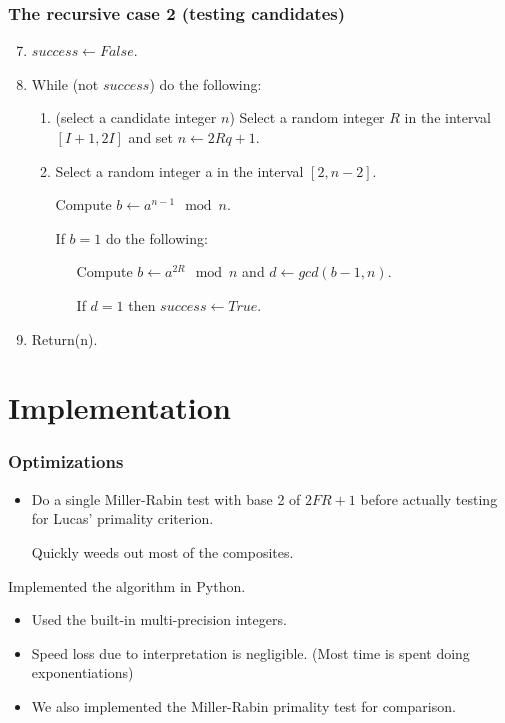 \documentclass{beamer}
\begin{document}
\begin{frame}
\frametitle{The recursive case 2 (testing candidates)}
\begin{enumerate}
  \setcounter{enumi}{6}
\item $success\leftarrow False$. 
\item While (not $success$) do the following:
  \begin{enumerate}
\item (select a candidate integer $n$) Select a random integer $R$ in the interval 
$[I + 1, 2I]$ and set $n\leftarrow 2Rq + 1$. 
\item Select a random integer a in the interval $[2, n - 2]$. 

Compute $b\leftarrow a^{n-1} \mod n$. 

If $b = 1$ do the following: 

\ \ \ Compute $b\leftarrow a^{2R} \mod n$ and $d\leftarrow  gcd(b - 1, n)$.

\ \ \ If $d = 1$ then $success\leftarrow True$.
\end{enumerate} 
\item Return(n). 
\end{enumerate}
\end{frame}

\section{Implementation}
\begin{frame}
\frametitle{Optimizations}
\begin{itemize}
\item Do a single Miller-Rabin test with base 2 of $2FR+1$ before
  actually testing for Lucas' primality criterion.

  Quickly weeds out most of the composites.
\end{itemize}
\end{frame}

\begin{frame}
Implemented the algorithm in Python.
\begin{itemize}
\item Used the built-in multi-precision integers.

\item Speed loss due to interpretation is negligible. (Most time is
  spent doing exponentiations)


\item We also implemented the Miller-Rabin primality test for
  comparison.
\end{itemize}
\end{frame}
\end{document}
